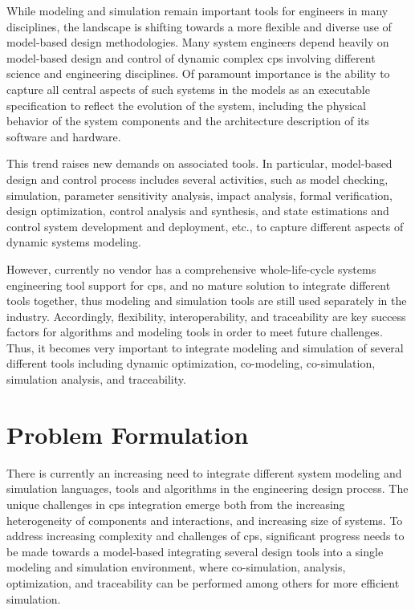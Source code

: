 While modeling and simulation remain important tools for engineers in many disciplines, the landscape is shifting towards a more flexible and diverse use of model-based design methodologies. Many system engineers depend heavily on model-based design and control of dynamic complex \acrshort{cps} involving different science and engineering disciplines. Of paramount importance is the ability to capture all central aspects of such systems in the models as an executable specification to reflect the evolution of the system, including the physical behavior of the system components and the architecture description of its software and hardware. 

This trend raises new demands on associated tools. In particular, model-based design and control process includes several activities, such as model checking, simulation, parameter sensitivity analysis, impact analysis, formal verification, design optimization, control analysis and synthesis, and state estimations and control system development and deployment, etc., to capture different aspects of dynamic systems modeling.

However, currently no vendor has a comprehensive whole-life-cycle systems engineering tool support for \acrshort{cps}, and no mature solution to integrate different tools together, thus modeling and simulation tools are still used separately in the industry. Accordingly, flexibility, interoperability, and traceability are key success factors for algorithms and modeling tools in order to meet future challenges. Thus, it becomes very important to integrate modeling and simulation of several different tools including dynamic optimization, co-modeling, co-simulation, simulation analysis, and traceability.


\section{Problem Formulation}
\label{sec:Problem Formulation}

There is currently an increasing need to integrate different system modeling and simulation languages, tools and algorithms in the engineering design process. The unique challenges in \acrshort{cps} integration emerge both from the increasing heterogeneity of components and interactions, and increasing size of systems. To address increasing complexity and challenges of \acrshort{cps}, significant progress needs to be made towards a model-based integrating several design tools into a single modeling and simulation environment, where co-simulation, analysis, optimization, and traceability can be performed among others for more efficient simulation.

